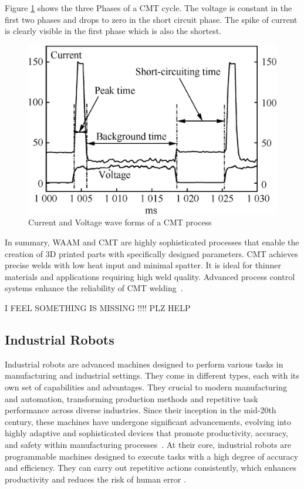 Figure \ref{fig:CMT} shows the three Phases of a CMT cycle. The voltage is constant in the first two phases and drops to zero in the short circuit phase. The spike of current is clearly visible in the first phase which is also the shortest.

\begin{figure}[h!]
	\centering
	\includegraphics[width=0.6\linewidth]{figures/CMT.jpg}
	\caption{Current and Voltage wave forms of a CMT process~\cite{Selvi.2018}}
	\label{fig:CMT}
\end{figure}

In summary, WAAM and CMT are highly sophisticated processes that enable the creation of 3D printed parts with specifically designed parameters. CMT achieves precise welds with low heat input and minimal spatter. It is ideal for thinner materials and applications requiring high weld quality. Advanced process control systems enhance the reliability of CMT welding~\cite{Rahul.2018, Pickin.2011}.


I FEEL SOMETHING IS MISSING !!!!\newline
PLZ HELP


\subsection{Industrial Robots}\label{IR}
Industrial robots are advanced machines designed to perform various tasks in manufacturing and industrial settings. They come in different types, each with its own set of capabilities and advantages. They crucial to modern manufacturing and automation, transforming production methods and repetitive task performance across diverse industries. Since their inception in the mid-20th century, these machines have undergone significant advancements, evolving into highly adaptive and sophisticated devices that promote productivity, accuracy, and safety within manufacturing processes~\cite{Ji.2019}.
At their core, industrial robots are programmable machines designed to execute tasks with a high degree of accuracy and efficiency. They can carry out repetitive actions consistently, which enhances productivity and reduces the risk of human error \cite{Siciliano.2016}. 

